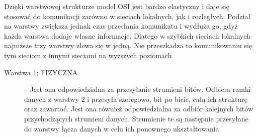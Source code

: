 \documentclass[a4paper,11pt]{article}
\begin{document}
Dzięki warstwowej strukturze model OSI jest bardzo elastyczny i daje się stosować do komunikacji zarówno w sieciach lokalnych, jak i rozległych. Podział na warstwy zwiększa jednak czas przesłania komunikatu i wydłuża go, gdyż każda warstwa dodaje własne informacje. Dlatego w szybkich sieciach lokalnych najniższe trzy warstwy zlewa się w jedną. Nie przeszkadza to komunikowaniu się tym sieciom z innymi sieciami na wyższych poziomach. 
\begin{description}
\item[Warstwa 1: FIZYCZNA] -- Jest ona odpowiedzialna za przesyłanie strumieni bitów. Odbiera ramki danych z warstwy 2 i przesyła szeregowo, bit po bicie, całą ich strukturę oraz zawartoć. Jest 
ona również odpowiedzialna za odbiór kolejnych bitów przychodzących strumieni danych. Strumienie te są następnie przesyłane do  warstwy łącza danych w celu ich ponownego ukształtowania.


\end{description}
\end{document}
